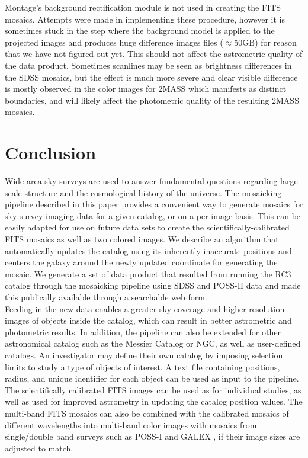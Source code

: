 \documentclass[5p]{elsarticle}
\begin{document}
\indent Montage's background rectification module is not used in creating the FITS mosaics. Attempts were made in implementing these procedure, however it  is sometimes stuck in the step where the background model is applied to the projected images and  produces huge difference images files ($\approx$50GB) for reason that we have not figured out yet. This should not affect the astrometric quality of the data product. Sometimes scanlines may be seen as brightness differences in the SDSS mosaics, but the effect is much more severe and clear visible difference is  mostly  observed in the color images for 2MASS which manifests as distinct boundaries, and will likely affect the photometric quality of the resulting 2MASS mosaics.
 \section{Conclusion}
\indent Wide-area sky surveys are used to answer fundamental questions regarding large-scale structure and the cosmological history of the universe. The mosaicking pipeline described in this paper provides a convenient way to generate mosaics for sky survey imaging data for a given catalog, or on a per-image basis. This can be easily adapted for use on future data sets to create the scientifically-calibrated FITS mosaics as well as two colored images. We describe an algorithm that automatically updates the catalog using its inherently inaccurate positions and centers the galaxy around the newly updated coordinate for generating the mosaic. We generate a set of data product that resulted from running the RC3 catalog through the mosaicking pipeline using  SDSS and POSS-II data and  made this publically available through a searchable web form.
\\
\indent Feeding in the new data enables a greater  sky coverage and higher resolution images of objects inside the catalog, which can result in better astrometric and photometric results.  In addition, the pipeline can also be extended for other astronomical catalog such as the Messier Catalog or NGC, as well as user-defined catalogs. An investigator may define their own catalog by imposing selection limits to study a type of objects of interest. A text file containing positions, radius, and unique identifier for each object can be used as input to the pipeline. The scientifically calibrated FITS images can be used as for individual studies, as well as used for improved astrometry in updating the catalog position values. The multi-band FITS mosaics can also be combined with the calibrated mosaics of different wavelengths into multi-band color images with mosaics from single/double band surveys such as POSS-I and GALEX , if their image sizes are adjusted to match.  
\end{document}
